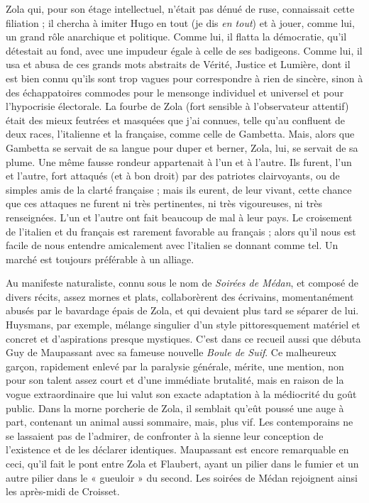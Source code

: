 \documentclass[french,twoside]{book} %
\begin{document}
Zola qui, pour son étage intellectuel, n’était pas dénué de ruse, connaissait cette filiation ; il chercha à imiter Hugo en tout (je dis {\itshape en tout}) et à jouer, comme lui, un grand rôle anarchique et politique. Comme lui, il flatta la démocratie, qu’il détestait au fond, avec une impudeur égale à celle de ses badigeons. Comme lui, il usa et abusa de ces grands mots abstraits de Vérité, Justice et Lumière, dont il est bien connu qu’ils sont trop vagues pour correspondre à rien de sincère, sinon à des échappatoires commodes pour le mensonge individuel et universel et pour l’hypocrisie électorale. La fourbe de Zola (fort sensible à l’observateur attentif) était des mieux feutrées et masquées que j’ai connues, telle qu’au confluent de deux races, l’italienne et la française, comme celle de Gambetta. Mais, alors que Gambetta se servait de sa langue pour duper et berner, Zola, lui, se servait de sa plume. Une même fausse rondeur appartenait à l’un et à l’autre. Ils furent, l’un et l’autre, fort attaqués (et à bon droit) par des patriotes clairvoyants, ou de simples amis de la clarté française ; mais ils eurent, de leur vivant, cette chance que ces attaques ne furent ni très pertinentes, ni très vigoureuses, ni très renseignées. L’un et l’autre ont fait beaucoup de mal à leur pays. Le croisement de l’italien et du français est rarement favorable au français ; alors qu’il nous est facile de nous entendre amicalement avec l’italien se donnant comme tel. Un marché est toujours préférable à un alliage.\par
Au manifeste naturaliste, connu sous le nom de {\itshape Soirées de Médan}, et composé de divers récits, assez mornes et plats, collaborèrent des écrivains, momentanément abusés par le bavardage épais de Zola, et qui devaient plus tard se séparer de lui. Huysmans, par exemple, mélange singulier d’un style pittoresquement matériel et concret et d’aspirations presque mystiques. C’est dans ce recueil aussi que débuta Guy de Maupassant avec sa fameuse nouvelle {\itshape Boule de Suif}. Ce malheureux garçon, rapidement enlevé par la paralysie générale, mérite, une mention, non pour son talent assez court et d’une immédiate brutalité, mais en raison de la vogue extraordinaire que lui valut son exacte adaptation à la médiocrité du goût public. Dans la morne porcherie de Zola, il semblait qu’eût poussé une auge à part, contenant un animal aussi sommaire, mais, plus vif. Les contemporains ne se lassaient pas de l’admirer, de confronter à la sienne leur conception de l’existence et de les déclarer identiques. Maupassant est encore remarquable en ceci, qu’il fait le pont entre Zola et Flaubert, ayant un pilier dans le fumier et un autre pilier dans le « gueuloir » du second. Les soirées de Médan rejoignent ainsi les après-midi de Croisset.\par
\end{document}
